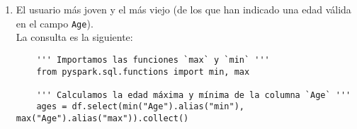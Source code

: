 \documentclass[12pt,a4paper,twoside,openright,titlepage,final]{article}
\begin{document}
\begin{enumerate}
	\begin{table}[htbp!]
		\centering
		\caption{Usuario más antiguo}
		\label{tbl:mas_antiguo}
	\end{table}
	
	
	\begin{table}[htbp!]
		\centering
		\caption{Usuario más reciente}
		\label{tbl:mas_reciente}
	\end{table}
	
	\item El usuario más joven y el más viejo (de los que han indicado una edad válida en el campo \texttt{Age}).\\
	
	La consulta es la siguiente:
	
	\begin{verbatim}
	''' Importamos las funciones `max` y `min` '''
	from pyspark.sql.functions import min, max
	
	''' Calculamos la edad máxima y mínima de la columna `Age` '''
	ages = df.select(min("Age").alias("min"), max("Age").alias("max")).collect()
	\end{verbatim}
	

\end{enumerate}
\end{document}
